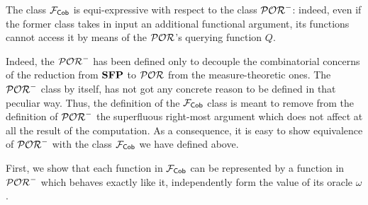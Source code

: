 The class $\mathcal{F}_{\mathsf{Cob}}$ is equi-expressive with respect to the class $\mathcal{POR}^-$: indeed,
even if the former class takes in input an additional functional argument,
its functions cannot access it by means of the $\mathcal{POR}$'s querying function $Q$.

Indeed, the $\mathcal{POR}^-$ has been defined only to decouple the combinatorial
concerns of the reduction from $\mathbf{SFP}$ to $\mathcal{POR}$ from the measure-theoretic ones.
The $\mathcal{POR}^-$ class by itself, has not got any concrete reason to be defined in that peculiar way.
Thus, the definition of the $\mathcal{F}_{\mathsf{Cob}}$ class is meant to remove from the definition of $\mathcal{POR}^-$
the superfluous right-most argument which does not affect at all the
result of the computation. As a consequence, it is easy to show
equivalence of $\mathcal{POR}^-$ with the
class $\mathcal{F}_{\mathsf{Cob}}$ we have defined above.

First, we show that each function in $\mathcal{F}_{\mathsf{Cob}}$ can be represented by a function
in $\mathcal{POR}^-$ which behaves exactly like it,
independently form the value of its oracle $\omega$.

